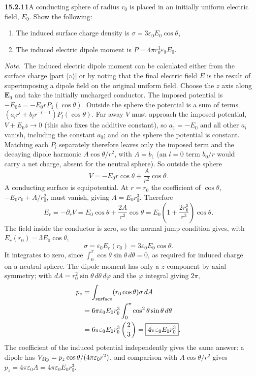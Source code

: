 \par\bigskip
\noindent\textbf{15.2.11}\quad A conducting sphere of radius $r_{0}$ is
placed in an initially uniform electric field, $E_{0}$. Show the
following:
\begin{enumerate}
\item[(a)] The induced surface charge density is
$\sigma=3\varepsilon_{0}E_{0}\cos\theta$,
\item[(b)] The induced electric dipole moment is
$P=4\pi r_{0}^{3}\varepsilon_{0}E_{0}$.
\end{enumerate}
\par\emph{Note.}~The induced electric dipole moment can be calculated
either from the surface charge [part (a)] or by noting that the final
electric field $E$ is the result of superimposing a dipole field on
the original uniform field.
\solution
Choose the $z$ axis along $\mathbf E_0$ and take the initially
uncharged conductor. The imposed potential is
$-E_0z=-E_0rP_1(\cos\theta)$. Outside the sphere the potential is a
sum of terms $(a_lr^l+b_lr^{-l-1})P_l(\cos\theta)$. Far away $V$ must
approach the imposed potential, $V+E_0z\to0$ (this also fixes the
additive constant), so $a_1=-E_0$ and all other $a_l$ vanish, including
the constant $a_0$; and on the sphere the potential is constant.
Matching each $P_l$ separately therefore leaves only the
imposed term and the decaying dipole harmonic $A\cos\theta/r^2$, with
$A=b_1$ (an $l=0$ term $b_0/r$ would carry a net charge, absent for the
neutral sphere). So outside the sphere
\[
V=-E_0r\cos\theta+\frac{A}{r^2}\cos\theta.
\]
A conducting surface is equipotential. At $r=r_0$ the coefficient of
$\cos\theta$, $-E_0r_0+A/r_0^2$, must vanish, giving $A=E_0r_0^3$.
Therefore
\[
E_r=-\partial_rV
=E_0\cos\theta+\frac{2A}{r^3}\cos\theta
=E_0\left(1+\frac{2r_0^3}{r^3}\right)\cos\theta.
\]
The field inside the conductor is zero, so the normal jump condition
gives, with $E_r(r_0)=3E_0\cos\theta$,
\[
\boxed{\sigma=\varepsilon_0E_r(r_0)=3\varepsilon_0E_0\cos\theta}.
\]
It integrates to zero, since $\int_0^\pi\cos\theta\sin\theta\,d\theta=0$,
as required for induced charge on a neutral sphere.
The dipole moment has only a $z$ component by axial symmetry; with
$dA=r_0^2\sin\theta\,d\theta\,d\varphi$ and the $\varphi$ integral
giving $2\pi$,
\begin{align*}
p_z&=\int_{\rm surface}(r_0\cos\theta)\sigma\,dA\\
&=6\pi\varepsilon_0E_0r_0^3
 \int_0^\pi\cos^2\theta\sin\theta\,d\theta\\
&=6\pi\varepsilon_0E_0r_0^3\left(\frac23\right)
=\boxed{4\pi\varepsilon_0E_0r_0^3}.
\end{align*}
The coefficient of the induced potential independently gives the same
answer: a dipole has $V_{\rm dip}=p_z\cos\theta/(4\pi\varepsilon_0r^2)$,
and comparison with $A\cos\theta/r^2$ gives
$p_z=4\pi\varepsilon_0A=4\pi\varepsilon_0E_0r_0^3$.

